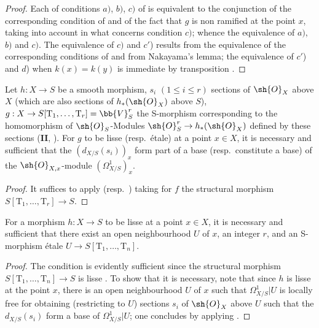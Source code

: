 \begin{proof}
Each of conditions $a)$, $b)$, $c)$ of  is equivalent to the conjunction of the corresponding condition of  and of the fact that $g$ is non ramified at the point $x$, taking into account  in what concerns condition $c)$; whence the equivalence of $a)$, $b)$ and $c)$.
The equivalence of $c)$ and $c'$) results from the equivalence of the corresponding conditions of  and from Nakayama's lemma; the equivalence of $c'$) and $d$) when $k(x)=k(y)$ is immediate by transposition .
\end{proof}

\begin{corollary}[17.11.3]
\label{IV.17.11.3}
Let $h:X\to S$ be a smooth morphism, $s_i$ $(1\leq i\leq r)$ sections of $\sh{O}_X$ above $X$ (which are also sections of $h_*(\sh{O}_X)$ above $S$), $g:X\to S[\mathrm{T}_1,\ldots,\mathrm{T}_r]=\bb{V}^r_S$ the S-morphism corresponding to the homomorphism of $\sh{O}_S$-Modules $\sh{O}^r_S\to h_*(\sh{O}_X)$ defined by these sections (\textbf{II}, ).
For $g$ to be lisse (resp.\ \'etale) at a point $x\in X$, it is necessary and sufficient that the $(d_{X/S}(s_i))_x$ form part of a base (resp.\ constitute a base) of the $\sh{O}_{X,x}$-module $(\Omega^1_{X/S})_x$.
\end{corollary}

\begin{proof}
It suffices to apply  (resp.\ ) taking for $f$ the structural morphism $S[\mathrm{T}_1,\ldots,\mathrm{T}_r]\to S$.
\end{proof}

\begin{corollary}[17.11.4]
\label{IV.17.11.4}
For a morphism $h:X\to S$ to be lisse at a point $x\in X$, it is necessary and sufficient that there exist an open neighbourhood $U$ of $x$, an integer $r$, and an S-morphism \'etale $U\to S[\mathrm{T}_1,\ldots,\mathrm{T}_n]$.
\end{corollary}

\begin{proof}
The condition is evidently sufficient since the structural morphism $S[\mathrm{T}_1,\ldots,\mathrm{T}_n]\to S$ is lisse .
To show that it is necessary, note that since $h$ is lisse at the point $x$, there is an open neighbourhood $U$ of $x$ such that $\Omega^1_{X/S}|U$ is locally free  for obtaining (restricting to $U$) sections $s_i$ of $\sh{O}_X$ above $U$ such that the $d_{X/S}(s_i)$ form a base of $\Omega^1_{X/S}|U$; one concludes by applying .
\end{proof}

